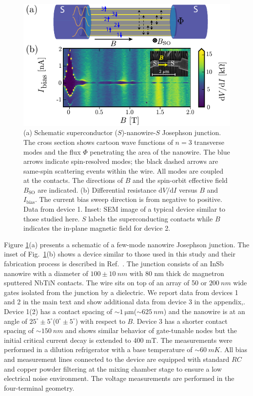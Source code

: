\begin{figure}
\begin{center}
\includegraphics[width=0.7\columnwidth]{chapter_supercurrent/figures/fig1.pdf}
\caption{(a) Schematic superconductor ($S$)-nanowire-$S$ Josephson junction. The cross section shows cartoon wave functions of $n=3$ transverse modes and the flux $\Phi$ penetrating the area of the nanowire. The blue arrows indicate spin-resolved modes; the black dashed arrows are same-spin scattering events within the wire. All modes are coupled at the contacts.
The directions of $B$ and the spin-orbit effective field $B_\mathrm{SO}$ are indicated. (b) Differential resistance $\mathrm{d}V/\mathrm{d}I$ versus $B$ and $I_\mathrm{bias}$.
The current bias sweep direction is from negative to positive. Data from device 1. Inset: SEM image of a typical device similar to those studied here. $S$ labels the superconducting contacts while $B$ indicates the in-plane magnetic field for device 2.}
\label{fig:figure1}
\end{center}
\end{figure}

Figure \ref{fig:figure1}(a) presents a schematic of a few-mode nanowire Josephson junction.
The inset of Fig.~\ref{fig:figure1}(b) shows a device similar to those used in this study and their fabrication process is described in Ref.~\cite{Mourik2012}.
The junction consists of an InSb nanowire with a diameter of $100 \pm \SI{10}{nm}$ with 80 nm thick dc magnetron sputtered NbTiN contacts.
The wire sits on top of an array of 50 or $\SI{200}{nm}$ wide gates isolated from the junction by a dielectric.
We report data from devices 1 and 2 in the main text and show additional data from device 3 in the appendix,.
Device 1(2) has a contact spacing of $\sim \SI{1}{\micro \m}$($\sim \SI{625}{nm}$) and the nanowire is at an angle of $25^\circ \pm 5^\circ$($0^\circ \pm 5^\circ$) with respect to $B$.
Device 3 has a shorter contact spacing of $\sim \SI{150}{nm}$ and shows similar behavior of gate-tunable nodes but the initial critical current decay is extended to 400 mT.
The measurements were performed in a dilution refrigerator with a base temperature of $\sim\SI{60}{mK}$.
All bias and measurement lines connected to the device are equipped with standard $RC$ and copper powder filtering at the mixing chamber stage to ensure a low electrical noise environment.
The voltage measurements are performed in the four-terminal geometry.

